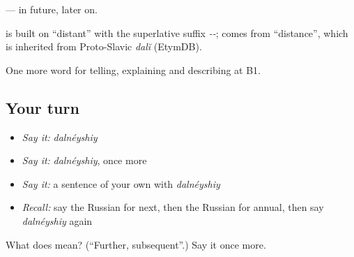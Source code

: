 \emph{ } — in future, later on.

\begin{cousinweb}
\emph{} is built on \emph{} \textquotedblleft{}distant\textquotedblright{} with the superlative suffix \emph{--}; \emph{} comes from \emph{} \textquotedblleft{}distance\textquotedblright{}, which is inherited from Proto-Slavic \emph{dalĭ} (EtymDB).
\end{cousinweb}

\begin{grammarlens}[title={What you've built}]
One more word for telling, explaining and describing at B1.
\end{grammarlens}

\subsection*{Your turn}
\begin{itemize}
\raggedright
  \item \emph{Say it:} \emph{dalnéyshiy}
  \item \emph{Say it:} \emph{dalnéyshiy}, once more
  \item \emph{Say it:} a sentence of your own with \emph{dalnéyshiy}
  \item \emph{Recall:} say the Russian for next, then the Russian for annual, then say \emph{dalnéyshiy} again
\end{itemize}

\begin{tcolorbox}[breakable,colback=teal!4,colframe=teal!35!black,title={Before you move on}]
What does  mean? (\textquotedblleft{}Further, subsequent\textquotedblright{}.) Say it once more.
\end{tcolorbox}
